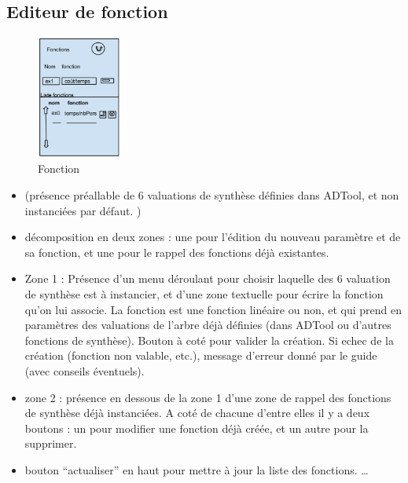 	\subsection{Editeur de fonction}
		\begin{figure}
			\begin{center}
				\includegraphics[width=0.25\textwidth]{figure/fonction.png}
			\end{center}
			\caption{Fonction}
			\label{fig:fonction}
		\end{figure}

		\begin{itemize}
			\item (présence préallable de 6 valuations de synthèse définies dans ADTool, et non instanciées par défaut. )
			\item décomposition en deux zones : une pour l'édition du nouveau paramètre et de sa fonction, et une pour le rappel des fonctions déjà existantes.
			\item Zone 1 : Présence d’un menu déroulant pour choisir laquelle des 6 valuation de synthèse est à instancier, et d'une zone textuelle pour écrire la fonction qu'on lui associe. La fonction est une fonction linéaire ou non, et qui prend en paramètres des valuations de l'arbre déjà définies (dans ADTool ou d'autres fonctions de synthèse). Bouton à coté pour valider la création. Si echec de la création (fonction non valable, etc.), message d'erreur donné par le guide (avec conseils éventuels).
			\item zone 2 : présence en dessous de la zone 1 d’une zone de rappel des fonctions de synthèse déjà instanciées. A coté de chacune d’entre elles il y a deux boutons : un pour modifier une fonction déjà créée, et un autre pour la supprimer.
			\item bouton “actualiser” en haut pour mettre à jour la liste des fonctions. \ldots
		\end{itemize}
		
		
		


